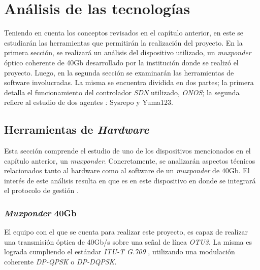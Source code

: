  
\chapter{Análisis de las tecnologías} %

\label{Chapter3} %

Teniendo en cuenta los conceptos revisados en el capítulo anterior, en este se estudiarán las herramientas que permitirán la realización del proyecto. En la primera sección, se realizará un análisis del dispositivo utilizado, un \textit{muxponder} óptico coherente de 40Gb desarrollado por la institución donde se realizó el proyecto.
Luego, en la segunda sección se examinarán las herramientas de software involucradas. La misma se encuentra dividida en dos partes; la primera detalla el funcionamiento del controlador \textit{SDN} utilizado, \textit{ONOS}; la segunda refiere al estudio de dos agentes \textit{\textit{}:} Sysrepo y Yuma123.



\section{Herramientas de \textit{Hardware}}

Esta sección comprende el estudio de uno de los dispositivos mencionados en el capítulo anterior, un \textit{muxponder}. Concretamente, se analizarán aspectos técnicos relacionados tanto al hardware como al software de un \textit{muxponder} de 40Gb. El interés de este análisis resulta en que es en este dispositivo en donde se integrará el protocolo de gestión \textit{\textit{}.}

\subsection{\textit{Muxponder} 40Gb}

El equipo con el que se cuenta para realizar este proyecto, es capaz de realizar una transmisión óptica de 40Gb/s sobre una señal de línea \textit{OTU3}. La misma es lograda cumpliendo el estándar \textit{ITU-T G.709} \parencite{itu7}, utilizando una modulación coherente \textit{DP-QPSK} o \textit{DP-DQPSK}.
\\

